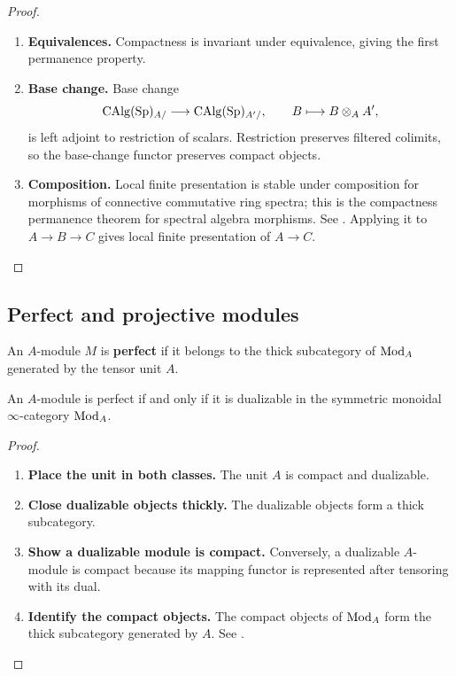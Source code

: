 \begin{proof}
\leavevmode
\begin{enumerate}[label=\textup{(\arabic*)}]
    \item \textbf{Equivalences.}
    Compactness is invariant under equivalence, giving the first permanence
    property.

    \item \textbf{Base change.}
    Base change
    \[
        \operatorname{CAlg}(\operatorname{Sp})_{A/}
        \longrightarrow
        \operatorname{CAlg}(\operatorname{Sp})_{A'/},
        \qquad
        B\longmapsto B\otimes_AA',
    \]
    is left adjoint to restriction of scalars. Restriction preserves filtered
    colimits, so the base-change functor preserves compact objects.

    \item \textbf{Composition.}
    Local finite presentation is stable under composition for morphisms of
    connective commutative ring spectra; this is the compactness permanence
    theorem for spectral algebra morphisms. See
    \cite{LurieHigherAlgebra,LurieSAG}. Applying it to
    \(A\to B\to C\) gives local finite presentation of \(A\to C\).
\end{enumerate}
\end{proof}

\subsection{Perfect and projective modules}

\begin{definition}
\label{def:perfect-module-spectrum}
An $A$-module $M$ is \textbf{perfect} if it belongs to the thick
subcategory of $\operatorname{Mod}_A$ generated by the tensor unit $A$.
\end{definition}

\begin{proposition}
\label{prop:perfect-equals-dualizable}
An $A$-module is perfect if and only if it is dualizable in the symmetric
monoidal $\infty$-category $\operatorname{Mod}_A$.
\end{proposition}

\begin{proof}
\leavevmode
\begin{enumerate}[label=\textup{(\arabic*)}]
    \item \textbf{Place the unit in both classes.}
    The unit $A$ is compact and dualizable.

    \item \textbf{Close dualizable objects thickly.}
    The dualizable objects form a
    thick subcategory.

    \item \textbf{Show a dualizable module is compact.}
    Conversely, a dualizable $A$-module is compact because
    its mapping functor is represented after tensoring with its dual.

    \item \textbf{Identify the compact objects.}
    The
    compact objects of $\operatorname{Mod}_A$ form the thick subcategory generated by $A$.
    See \cite{LurieHigherAlgebra}.
\end{enumerate}
\end{proof}

